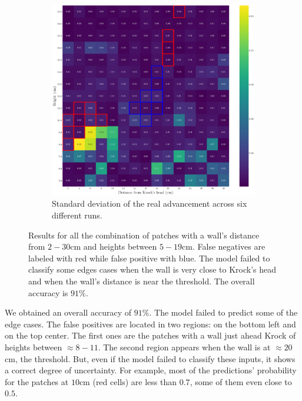     \begin{figure}[htbp]
        \centering
    \ContinuedFloat
    \begin{subfigure}[b]{0.66\linewidth}
        \includegraphics[width=\linewidth]{../img/5/custom_patches/walls_heights/walls_heights_std.png}
        \caption{Standard deviation of the real advancement across six different runs.}
        \label{fig : walls-heights-std}
    \end{subfigure}   
\caption{Results for all the combination of patches with a wall's distance from $2-30$cm and heights between $5 - 19$cm. False negatives are labeled with red while false positive with blue. The model failed to classify some edges cases when the wall is very close to Krock's head and when the wall's distance is near the threshold. The overall accuracy is $91\%$.}    
\label{fig : walls-heights}
\end{figure}
We obtained an overall accuracy of $91\%$. The model failed to predict some of the edge cases. The false positives are located in two regions: on the bottom left and on the top center. The first ones are the patches with a wall just ahead Krock of heights between $\approx 8 - 11$. The second region appears when the wall is at $\approx 20$cm, the threshold. But, even if the model failed to classify these inputs, it shows a correct degree of uncertainty. For example, most of the predictions' probability for the patches at $10$cm (red cells) are less than $0.7$, some of them even close to $0.5$.

